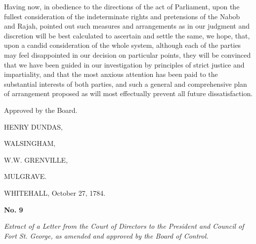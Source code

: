 Having now, in obedience to the directions of the act of Parliament, upon the fullest consideration of the indeterminate rights and pretensions of the Nabob and Rajah, pointed out such measures and arrangements as in our judgment and discretion will be best calculated to ascertain and settle the same, we hope, that, upon a candid consideration of the whole system, although each of the parties may feel disappointed in our decision on particular points, they will be convinced that we have been guided in our investigation by principles of strict justice and impartiality, and that the most anxious attention has been paid to the substantial interests of both parties, and such a general and comprehensive plan of arrangement proposed as will most effectually prevent all future dissatisfaction.

Approved by the Board.

\hspace{3in} HENRY DUNDAS,

\hspace{3in} WALSINGHAM,

\hspace{3in} W.W. GRENVILLE,

\hspace{3in} MULGRAVE.

WHITEHALL, October 27, 1784.

\PRLsep
\begin{center}
  \textbf{\large No. 9} \par 
\end{center}
\textit{Extract of a Letter from the Court of Directors to the President and Council of Fort St. George, as amended and approved by the Board of Control.}
\vspace{0.3cm}




